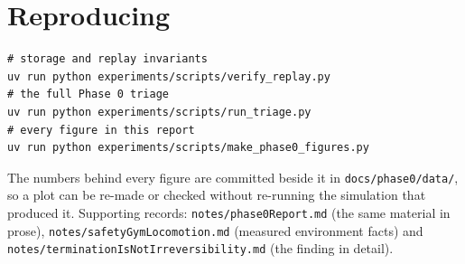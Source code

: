 \documentclass[11pt,a4paper]{article}
\begin{document}
\section*{Reproducing}

{\small
\begin{verbatim}
# storage and replay invariants
uv run python experiments/scripts/verify_replay.py
# the full Phase 0 triage
uv run python experiments/scripts/run_triage.py
# every figure in this report
uv run python experiments/scripts/make_phase0_figures.py
\end{verbatim}
}

The numbers behind every figure are committed beside it in \texttt{docs/phase0/data/}, so a plot
can be re-made or checked without re-running the simulation that produced it. Supporting records:
\texttt{notes/phase0Report.md} (the same material in prose),
\texttt{notes/safetyGymLocomotion.md} (measured environment facts) and
\texttt{notes/terminationIsNotIrreversibility.md} (the finding in detail).
\end{document}
